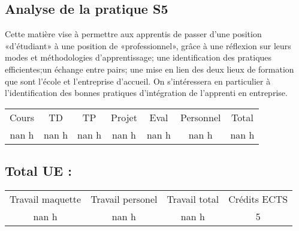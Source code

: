 \subsection{Analyse de la pratique S5}%
\label{subsec:AnalysedelapratiqueS5}%

%
Cette matière vise à permettre aux apprentis de passer d’une position «d’étudiant» à une position de «professionnel», grâce à une réflexion sur leurs modes et méthodologies d’apprentissage; une identification des pratiques efficientes;un échange entre pairs; une mise en lien des deux lieux de formation que sont l’école et l’entreprise d’accueil. On s'intéressera en particulier à l'identification des bonnes pratiques d'intégration de l’apprenti en entreprise.%
\begin{longtable}{c c c c c c c}%
\hline%
Cours&TD&TP&Projet&Eval&Personnel&Total\\%
nan h&nan h&nan h&nan h&nan h&nan h&nan h\\%
\hline%
\end{longtable}%
\subsection{Total UE :}%
\label{subsec:TotalUE}%

%
\begin{longtable}{c c c c}%
\hline%
Travail maquette&Travail personel&Travail total&Crédits ECTS\\%
nan h&nan h&nan h&5\\%
\hline%
\end{longtable}